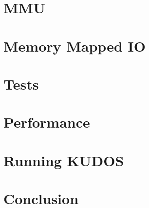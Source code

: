 \documentclass[11pt, twocolumn]{article}
\begin{document}
\section{MMU}


\section{Memory Mapped IO}


\section{Tests}


\section{Performance}


\section{Running KUDOS}


\section{Conclusion}


\newpage
\clearpage %
{}


\newpage
\appendix
\end{document}
